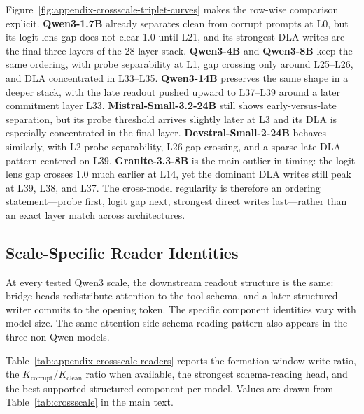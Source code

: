 Figure~\ref{fig:appendix-crossscale-triplet-curves} makes the row-wise
comparison explicit.
\textbf{Qwen3-1.7B} already separates clean from corrupt prompts at L0, but its
logit-lens gap does not clear 1.0 until L21, and its strongest DLA writes are
the final three layers of the 28-layer stack.
\textbf{Qwen3-4B} and \textbf{Qwen3-8B} keep the same ordering, with probe
separability at L1, gap crossing only around L25--L26, and DLA concentrated in
L33--L35.
\textbf{Qwen3-14B} preserves the same shape in a deeper stack, with the late
readout pushed upward to L37--L39 around a later commitment layer L33.
\textbf{Mistral-Small-3.2-24B} still shows early-versus-late separation, but
its probe threshold arrives slightly later at L3 and its DLA is especially
concentrated in the final layer.
\textbf{Devstral-Small-2-24B} behaves similarly, with L2 probe separability,
L26 gap crossing, and a sparse late DLA pattern centered on L39.
\textbf{Granite-3.3-8B} is the main outlier in timing: the logit-lens gap
crosses 1.0 much earlier at L14, yet the dominant DLA writes still peak at
L39, L38, and L37. The cross-model regularity is therefore an ordering
statement---probe first, logit gap next, strongest direct writes last---rather
than an exact layer match across architectures.

\subsection{Scale-Specific Reader Identities}
\label{appendix:cross-scale:readers}

At every tested Qwen3 scale, the downstream readout structure is the same:
bridge heads redistribute attention to the tool schema, and a later structured
writer commits to the opening token. The specific component identities vary
with model size. The same attention-side schema reading pattern also appears in
the three non-Qwen models.

Table~\ref{tab:appendix-crossscale-readers} reports the formation-window write
ratio, the $K_{\mathrm{corrupt}}/K_{\mathrm{clean}}$ ratio when available, the
strongest schema-reading head, and the best-supported structured component per
model.
Values are drawn from Table~\ref{tab:crossscale} in the main text.

